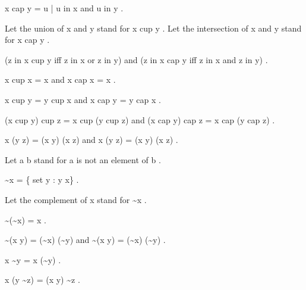 \documentclass[a4paper,draft]{amsproc}
\begin{document}
\begin{forthel}
\begin{definition} 
 x cap y = {  u | u in x  and  u in y } .
\end{definition}

Let the union of  x  and  y  stand for  x cup y .
Let the intersection of  x  and  y  stand for  x cap y .

\begin{theorem}
 (z in x cup y  iff  z in x  or  z in y) 
and  (z in x cap y  iff  z in x  and  z in y) .
\end{theorem}

\begin{theorem}
 x cup x = x  and  x cap x = x .
\end{theorem}

\begin{theorem}
 x cup y = y cup x  and  x cap y = y cap x .
\end{theorem}

\begin{theorem}
 (x cup y) cup z = x cup (y cup z)  
and  (x cap y) cap z = x cap (y cap z) .
\end{theorem}

\begin{theorem}
 x \cap (y \cup z) = (x \cap y) \cup (x \cap z) 
and  x \cup (y \cap z) = (x \cup y) \cap (x \cup z) .
\end{theorem}

Let  a \notin b  stand for  a  is not an element of  b .

\begin{definition}  \sim x = \{ set  y : y \notin x\} .\end{definition}
Let the complement of  x  stand for  \sim x .

\begin{theorem}
 \sim (\sim x) = x .
\end{theorem}

\begin{theorem}
 \sim (x \cup y) = (\sim x) \cap (\sim y)  
and  \sim (x \cap y) = (\sim x) \cup (\sim y) .
\end{theorem}

\begin{definition}  x \sim y = x \cap (\sim y) .\end{definition}

\begin{theorem}
 x \cap (y \sim z) = (x \cap y) \sim z .
\end{theorem}


\end{forthel}
\end{document}
